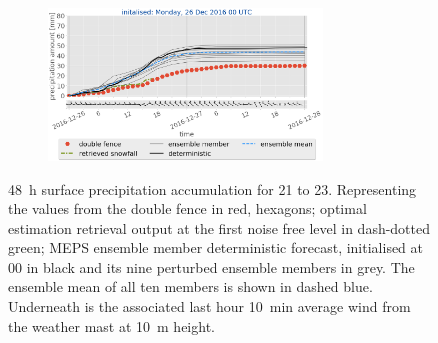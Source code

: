 \begin{figure}[H]
\begin{subfigure}[t]{0.97\textwidth}
		\caption{}\label{fig:sfc_acc23}
	\end{subfigure}
	\begin{subfigure}[t]{\textwidth}
		\centering
		\includegraphics[trim={1.2cm 0cm 1.1cm 21.4cm},clip,width=0.8\textwidth]{./fig_sfc_acc/acc_wind_20161226_00}
	\end{subfigure}
	\caption{\SI{48}{\hour} surface precipitation accumulation for \num{21} to \SI{23}{\dec}. Representing the values from the double fence in red, hexagons; optimal estimation retrieval output at the first noise free level
		in dash-dotted green; MEPS ensemble member deterministic forecast, initialised at \SI{00}{\UTC} in black and its nine perturbed ensemble members in grey. The ensemble mean of all ten members is shown in dashed blue. Underneath is the associated last hour \SI{10}{\minute} average wind from the weather mast at \SI{10}{\metre} height. }\label{fig:sfc_acc:2123}
\end{figure}
